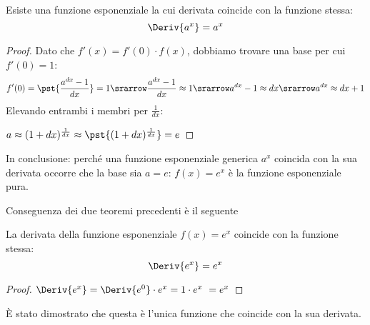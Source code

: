 \begin{teorema}
Esiste una funzione esponenziale la cui derivata coincide con la 
funzione stessa: 
\[\Deriv{a^x}=a^x\]
\end{teorema}
\begin{proof}
Dato che \(f'(x) = f'(0) \cdot f(x)\), 
dobbiamo trovare una base per cui \(f'(0)=1\):
\[f'(0) = \pst{\dfrac{a^{dx}-1}{dx}} = 1 \srarrow 
\dfrac{a^{dx}-1}{dx} \approx 1 \srarrow 
a^{dx}-1 \approx dx \srarrow 
a^{dx} \approx dx +1 \]
Elevando entrambi i membri per \(\frac{1}{dx}\):

\hspace{35mm}
\(a \approx (1 +dx)^\frac{1}{dx} \approx \pst{(1 +dx)^\frac{1}{dx}} = e\)
\end{proof}

In conclusione: perché una funzione esponenziale generica \(a^x\) coincida 
con la sua derivata occorre che la base sia \(a=e\): \(f(x)=e^x\) è la 
funzione esponenziale pura.

% 
% 


Conseguenza dei due teoremi precedenti è il seguente
\begin{teorema}
La derivata della funzione esponenziale \(f(x)=e^x\) coincide con la 
funzione stessa: 
\[\Deriv{e^x}=e^x\]
\end{teorema}
\begin{proof}

\hspace{20mm}
\(\Deriv{e^x} = \Deriv{e^0} \cdot e^x = 1 \cdot e^x\ = e^x\)
\end{proof}
È stato dimostrato che questa è l'unica funzione che coincide con la sua 
derivata.

